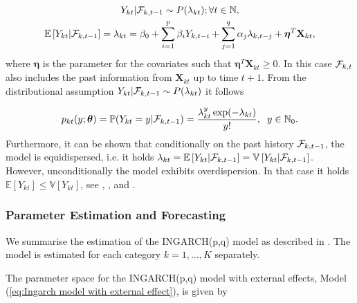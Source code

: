 \begin{equation}
\begin{gathered}
\label{eq:Ingarch model with external effect}
Y_{kt} | \mathcal{F}_{k,t-1} \sim P(\lambda_{kt}); \forall t \in \mathbb{N}, \\
\mathbb{E}\left[Y_{kt} | \mathcal{F}_{k,t-1} \right] = \lambda_{kt} = \beta_0 + \sum_{i=1}^p\beta_i Y_{k,t-i} + \sum_{j=1}^q\alpha_j \lambda_{k,t-j} + \bm{\eta}^T\textbf{X}_{kt},
\end{gathered}
\end{equation}
%
where $\bm{\eta}$ is the parameter for the covariates such that $\bm{\eta}^T\textbf{X}_{kt} \geq 0$. In this case $\mathcal{F}_{k,t}$ also includes the past information from $\textbf{X}_{kt}$ up to time $t+1$. 
From the distributional assumption $Y_{kt} | \mathcal{F}_{k,t-1} \sim P(\lambda_{kt})$ it follows

\begin{equation}
p_{kt}(y;\bm{\theta})=\mathbb{P}(Y_{kt}=y | \mathcal{F}_{k,t-1}) = \frac{\lambda_{kt}^y \exp(-\lambda_{kt})}{y!}, \hspace{0.2cm} y \in \mathbb{N}_0.
\label{eq:Ingarch Distribution}
\end{equation}
%
Furthermore, it can be shown that conditionally on the past history $\mathcal{F}_{k,t-1}$, the model is equidispersed, i.e. it holds $\lambda_{kt} = \mathbb{E}\left[Y_{kt} | \mathcal{F}_{k,t-1}\right] = \mathbb{V}\left[Y_{kt} | \mathcal{F}_{k,t-1}\right]$. However, unconditionally the model exhibits overdispersion. In that case it holds $\mathbb{E}\left[Y_{kt}\right] \leq \mathbb{V}\left[Y_{kt}\right] $, see \textcite{Liboschik:2016}, \textcite{Fokianos:2011}, and \textcite{Heinen:2003}. 

\subsubsection{Parameter Estimation and Forecasting}
\label{sec: Estimation of the Ingarch Model}

We summarise the estimation of the INGARCH(p,q) model as described in \textcite{Liboschik:2016}. The model is estimated for each category $k=1,\ldots,K$ separately. 

The parameter space for the INGARCH(p,q) model with external effects, Model (\ref{eq:Ingarch model with external effect}), is given by 

